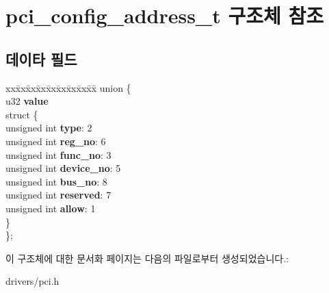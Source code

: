 \section{pci\-\_\-config\-\_\-address\-\_\-t 구조체 참조}
\label{structpci__config__address__t}
\subsection*{데이타 필드}
\begin{DoxyCompactItemize}
\item 
\begin{tabbing}
xx\=xx\=xx\=xx\=xx\=xx\=xx\=xx\=xx\=\kill
union \{\\
\>u32 {\bfseries value}\\
\>struct \{\\
\>\>unsigned int {\bfseries type}: 2\\
\>\>unsigned int {\bfseries reg\_no}: 6\\
\>\>unsigned int {\bfseries func\_no}: 3\\
\>\>unsigned int {\bfseries device\_no}: 5\\
\>\>unsigned int {\bfseries bus\_no}: 8\\
\>\>unsigned int {\bfseries reserved}: 7\\
\>\>unsigned int {\bfseries allow}: 1\\
\>\} \label{unionpci__config__address__t_1_1@3_a0977c6c79e266daf955ad5620abbf181}
\\
\}; \label{structpci__config__address__t_a05177a7ac0dd72c3c6d6b71893e03f86}
\\

\end{tabbing}\end{DoxyCompactItemize}


이 구조체에 대한 문서화 페이지는 다음의 파일로부터 생성되었습니다.\-:\begin{DoxyCompactItemize}
\item 
drivers/pci.\-h\end{DoxyCompactItemize}
